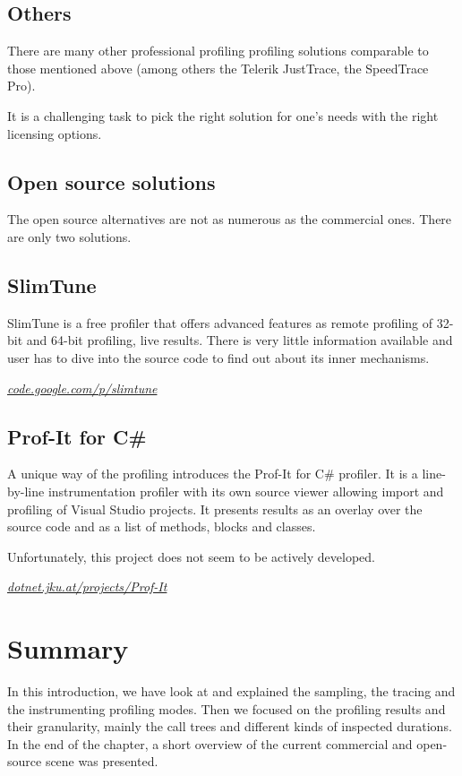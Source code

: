 \subsection{Others}
There are many other professional profiling profiling solutions comparable to those mentioned above (among others the Telerik JustTrace, the SpeedTrace Pro).

It is a challenging task to pick the right solution for one's needs with the right licensing options.

\subsection*{Open source solutions}
The open source alternatives are not as numerous as the commercial ones. There are only two solutions.

\subsection{SlimTune}
SlimTune is a free profiler that offers advanced features as remote profiling of 32-bit and 64-bit profiling, live results. There is very little information available and user has to dive into the source code to find out about its inner mechanisms.

\textit{\href{http://code.google.com/p/slimtune}{code.google.com/p/slimtune}}

\subsection{Prof-It for C\#}
A unique way of the profiling introduces the Prof-It for C\# profiler. It is a line-by-line instrumentation profiler with its own source viewer allowing import and profiling of Visual Studio projects. It presents results as an overlay over the source code and as a list of methods, blocks and classes. 

Unfortunately, this project does not seem to be actively developed. 

\textit{\href{http://dotnet.jku.at/projects/Prof-It/}{dotnet.jku.at/projects/Prof-It}}

\section*{Summary}
In this introduction, we have look at and explained the sampling, the tracing and the instrumenting profiling modes. Then we focused on the profiling results and their granularity, mainly the call trees and different kinds of inspected durations. In the end of the chapter, a short overview of the current commercial and open-source scene was presented.

 

